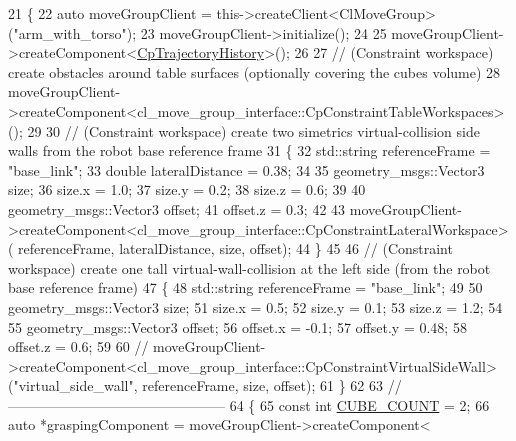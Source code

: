 \begin{DoxyCode}
21         \{
22             \textcolor{keyword}{auto} moveGroupClient = this->createClient<ClMoveGroup>(\textcolor{stringliteral}{"arm\_with\_torso"});
23             moveGroupClient->initialize();
24 
25             moveGroupClient->createComponent<\hyperlink{classcl__move__group__interface_1_1CpTrajectoryHistory}{CpTrajectoryHistory}>();
26 
27             \textcolor{comment}{// (Constraint workspace) create obstacles around table surfaces (optionally covering the cubes
       volume)}
28             moveGroupClient->createComponent<cl\_move\_group\_interface::CpConstraintTableWorkspaces>();
29 
30             \textcolor{comment}{// (Constraint workspace) create two simetrics virtual-collision side walls from the robot base
       reference frame}
31             \{
32                 std::string referenceFrame = \textcolor{stringliteral}{"base\_link"};
33                 \textcolor{keywordtype}{double} lateralDistance = 0.38;
34 
35                 geometry\_msgs::Vector3 size;
36                 size.x = 1.0;
37                 size.y = 0.2;
38                 size.z = 0.6;
39 
40                 geometry\_msgs::Vector3 offset;
41                 offset.z = 0.3;
42 
43                 moveGroupClient->createComponent<cl\_move\_group\_interface::CpConstraintLateralWorkspace>(
      referenceFrame, lateralDistance, size, offset);
44             \}
45 
46             \textcolor{comment}{// (Constraint workspace) create one tall virtual-wall-collision at the left side (from the
       robot base reference frame)}
47             \{
48                 std::string referenceFrame = \textcolor{stringliteral}{"base\_link"};
49 
50                 geometry\_msgs::Vector3 size;
51                 size.x = 0.5;
52                 size.y = 0.1;
53                 size.z = 1.2;
54 
55                 geometry\_msgs::Vector3 offset;
56                 offset.x = -0.1;
57                 offset.y = 0.48;
58                 offset.z = 0.6;
59 
60                 \textcolor{comment}{//
      moveGroupClient->createComponent<cl\_move\_group\_interface::CpConstraintVirtualSideWall>("virtual\_side\_wall", referenceFrame, size, offset);}
61             \}
62 
63             \textcolor{comment}{//-----------------------------------------------}
64             \{
65                 \textcolor{keyword}{const} \textcolor{keywordtype}{int} \hyperlink{namespacesm__fetch__two__table__whiskey__pour_ab6321f5657e6b4b621a9b084f81bdeb6}{CUBE\_COUNT} = 2;
66                 \textcolor{keyword}{auto} *graspingComponent = moveGroupClient->createComponent<

\end{DoxyCode}
